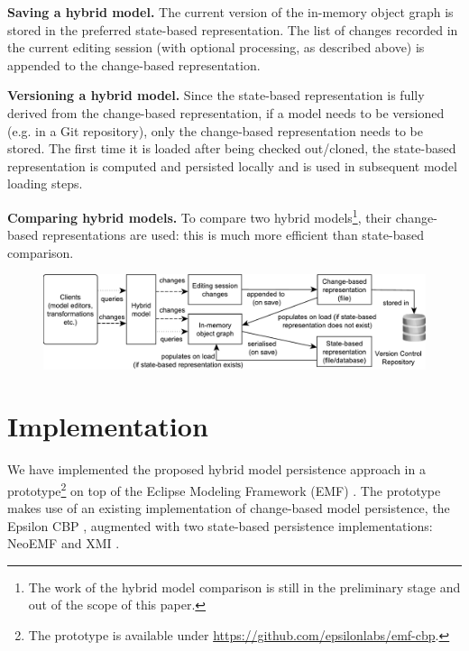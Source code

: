 \textbf{Saving a hybrid model.} The current version of the in-memory object graph is stored in the preferred state-based representation. The list of changes recorded in the current editing session (with optional processing, as described above) is appended to the change-based representation.

\textbf{Versioning a hybrid model.} Since the state-based representation is fully derived from the change-based representation, if a model needs to be versioned (e.g. in a Git repository), only the change-based representation needs to be stored. The first time it is loaded after being checked out/cloned, the state-based representation is computed and persisted locally and is used in subsequent model loading steps.

\textbf{Comparing hybrid models.} To compare two hybrid models\footnote{The work of the hybrid model comparison is still in the preliminary stage and out of the scope of this paper.}, their change-based representations are used: this is much more efficient than state-based comparison. 

\begin{figure}[t]
    \includegraphics[width=\linewidth]{images/hybrid_persistence}
    \label{fig:hybrid_persistence}
\end{figure}

\vspace{-15pt}
\section{Implementation}
\label{sec:implementation}

\vspace{-10pt}
We have implemented the proposed hybrid model persistence approach in a prototype\footnote{The prototype is available under \url{https://github.com/epsilonlabs/emf-cbp}.} on top of the Eclipse Modeling Framework (EMF) \cite{steinberg2008emf}. The prototype makes use of an existing implementation of change-based model persistence, the Epsilon CBP \cite{DBLP:conf/models/YohannisKP17}, augmented with two state-based persistence implementations: NeoEMF \cite{daniel2016neoemf} and XMI \cite{omg2018xmi}.

